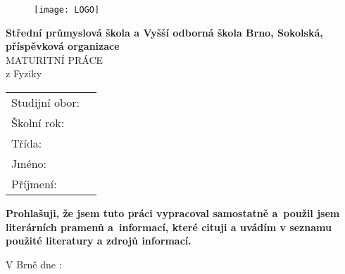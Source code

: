 \begin{titlepage}
	\begin{center}
	
	
	\def\tru{1}
	\if\grafika\tru
		\begin{figure}[h]
		\texttt{[image: LOGO]}
		\centering
		\end{figure}
		\else
			\large
			\textbf{Střední průmyslová škola a Vyšší odborná škola Brno, Sokolská,
			příspěvková organizace}\\
			
	\fi
		\vfill
		\vspace*{4.5cm}
		\Huge
		MATURITNÍ PRÁCE\\
		z Fyziky\\
		\vspace*{3.5cm}
		\LARGE
		\textbf{\nazevprace}
		\vspace*{3.5cm}
		
		\large
		\begin{tabular}{p{} p{}}
			Studijní obor:& \obor\\
			Školní rok:& \rok\\
			Třída:& \trida\\
			Jméno:& \textbf{\jmeno}\\
			Příjmení:& \textbf{\prijmeni}\\
		\end{tabular}
	\end{center}
\end{titlepage}

\thispagestyle{empty}
\vspace*{\fill}
\hspace*{-20pt}
\textbf{Prohlašuji, že jsem tuto práci vypracoval samostatně a~použil jsem literárních
	pramenů a~informací, které cituji a uvádím v seznamu použité literatury a zdrojů
	informací.}\vspace*{1.5cm}

\makeatother

	V Brně dne :
	\signaturedash[3cm]{}\hspace*{7cm}
	\signaturedash[3cm]{\jmeno \hspace*{0.5mm} \prijmeni}
	\pagebreak